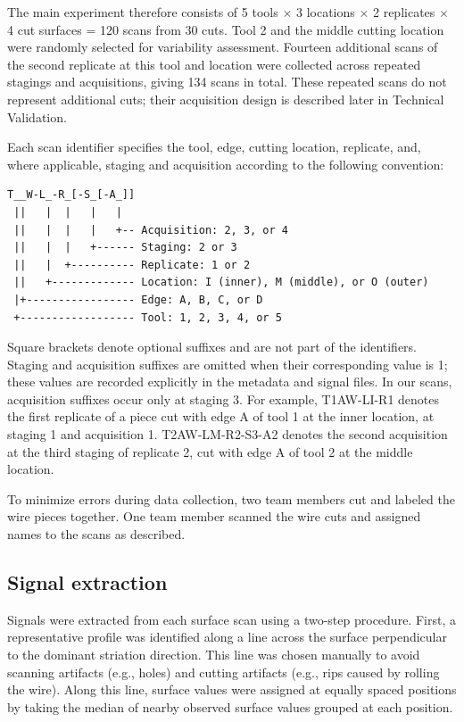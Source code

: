\documentclass[11pt,a4paper]{article}
\begin{document}
The main experiment therefore consists of 5 tools \(\times\) 3 locations
\(\times\) 2 replicates \(\times\) 4 cut surfaces = 120 scans from 30
cuts. Tool 2 and the middle cutting location were randomly selected for
variability assessment. Fourteen additional scans of the second
replicate at this tool and location were collected across repeated
stagings and acquisitions, giving 134 scans in total. These repeated
scans do not represent additional cuts; their acquisition design is
described later in Technical Validation.

Each scan identifier specifies the tool, edge, cutting location,
replicate, and, where applicable, staging and acquisition according to
the following convention:

\begin{samepage}
\begin{verbatim}
T__W-L_-R_[-S_[-A_]]
 ||   |  |   |   |
 ||   |  |   |   +-- Acquisition: 2, 3, or 4
 ||   |  |   +------ Staging: 2 or 3
 ||   |  +---------- Replicate: 1 or 2
 ||   +------------- Location: I (inner), M (middle), or O (outer)
 |+----------------- Edge: A, B, C, or D
 +------------------ Tool: 1, 2, 3, 4, or 5
\end{verbatim}
\end{samepage}

Square brackets denote optional suffixes and are not part of the
identifiers. Staging and acquisition suffixes are omitted when their
corresponding value is 1; these values are recorded explicitly in the
metadata and signal files. In our scans, acquisition suffixes occur only
at staging 3. For example, T1AW-LI-R1 denotes the first replicate of a
piece cut with edge A of tool 1 at the inner location, at staging 1 and
acquisition 1. T2AW-LM-R2-S3-A2 denotes the second acquisition at the
third staging of replicate 2, cut with edge A of tool 2 at the middle
location.

To minimize errors during data collection, two team members cut and
labeled the wire pieces together. One team member scanned the wire cuts
and assigned names to the scans as described.

\subsection*{Signal extraction}\label{sec-extract-profiles}

Signals were extracted from each surface scan using a two-step
procedure. First, a representative profile was identified along a line
across the surface perpendicular to the dominant striation direction.
This line was chosen manually to avoid scanning artifacts (e.g., holes)
and cutting artifacts (e.g., rips caused by rolling the wire). Along
this line, surface values were assigned at equally spaced positions by
taking the median of nearby observed surface values grouped at each
position.
\end{document}
